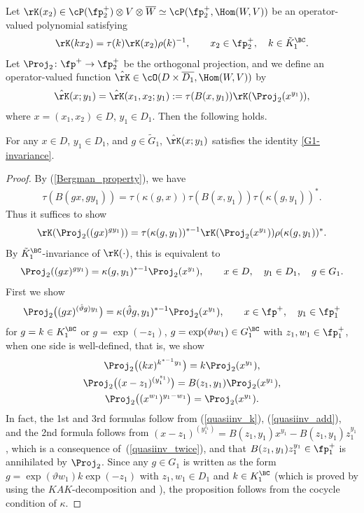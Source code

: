 Let $\rK(x_2)\in\cP(\fp^+_2)\otimes V\otimes\overline{W}\simeq\cP(\fp^+_2,\Hom(W,V))$ be an operator-valued polynomial satisfying
\begin{gather}\label{K-invariance}
\rK(kx_2)=\tau(k)\rK(x_2)\rho(k)^{-1}, \qquad x_2\in \fp^+_2,\quad k\in \tilde{K}^\BC_1.
\end{gather}
Let $\Proj_2\colon \fp^+\to\fp^+_2$ be the orthogonal projection, and we define an operator-valued function $\hat{\rK}\in\cO(D\times \overline{D_1}, \Hom(W,V))$ by
\begin{gather}\label{Khat}
\hat{\rK}(x;y_1)=\hat{\rK}(x_1,x_2;y_1):=\tau(B(x,y_1))\rK(\Proj_2(x^{y_1})),
\end{gather}
where $x=(x_1,x_2)\in D$, $y_1\in D_1$. Then the following holds.
\begin{Proposition}\label{kernelfunc}
For any $x\in D$, $y_1\in D_1$, and $g\in\tilde{G}_1$, $\hat{\rK}(x;y_1)$ satisfies the identity \eqref{G1-invariance}.
\end{Proposition}
\begin{proof}
By (\ref{Bergman_property}), we have
\begin{gather*} \tau(B(gx,gy_1))=\tau(\kappa(g,x))\tau(B(x,y_1))\tau(\kappa(g,y_1))^*. \end{gather*}
Thus it suffices to show
\begin{gather*} \rK(\Proj_2((gx)^{gy_1}))=\tau(\kappa(g,y_1))^{*-1}\rK(\Proj_2(x^{y_1}))\rho(\kappa(g,y_1))^*. \end{gather*}
By $\tilde{K}^\BC_1$-invariance of $\rK(\cdot)$, this is equivalent to
\begin{gather*} \Proj_2((gx)^{gy_1})=\kappa(g,y_1)^{*-1}\Proj_2(x^{y_1}), \qquad x\in D,\quad y_1\in D_1,\quad g\in G_1. \end{gather*}
First we show
\begin{gather*} \Proj_2\big((gx)^{(\hat{\vartheta}g)y_1}\big)=\kappa(\hat{\vartheta}g,y_1)^{*-1}\Proj_2(x^{y_1}), \qquad x\in \fp^+,\quad y_1\in \fp^+_1 \end{gather*}
for $g=k\in K_1^\BC$ or $g=\exp(-z_1)$, $g=\exp(\vartheta w_1)\in G_1^\BC$ with $z_1,w_1\in\fp^+_1$,
when one side is well-defined, that is, we show
\begin{gather*}
\Proj_2\big((kx)^{k^{*-1}y_1}\big)=k\Proj_2(x^{y_1}), \\
\Proj_2\big((x-z_1)^{(y_1^{z_1})}\big)=B(z_1,y_1)\Proj_2(x^{y_1}), \\
\Proj_2\big((x^{w_1})^{y_1-w_1}\big)=\Proj_2(x^{y_1}).
\end{gather*}
In fact, the 1st and 3rd formulas follow from (\ref{quasiinv_k}), (\ref{quasiinv_add}),
and the 2nd formula follows from $(x-z_1)^{(y_1^{z_1})}=B(z_1,y_1)x^{y_1}-B(z_1,y_1)z_1^{y_1}$,
which is a consequence of~(\ref{quasiinv_twice}), and that $B(z_1,y_1)z_1^{y_1}\in\fp^+_1$ is annihilated by $\Proj_2$.
Since any $g\in G_1$ is written as the form $g=\exp(\vartheta w_1)k\exp(-z_1)$ with $z_1,w_1\in D_1$ and $k\in K^\BC_1$
(which is proved by using the $KAK$-decomposition and \cite[Part~III, Lemma~III.2.4]{FKKLR}),
the proposition follows from the cocycle condition of $\kappa$.
\end{proof}

